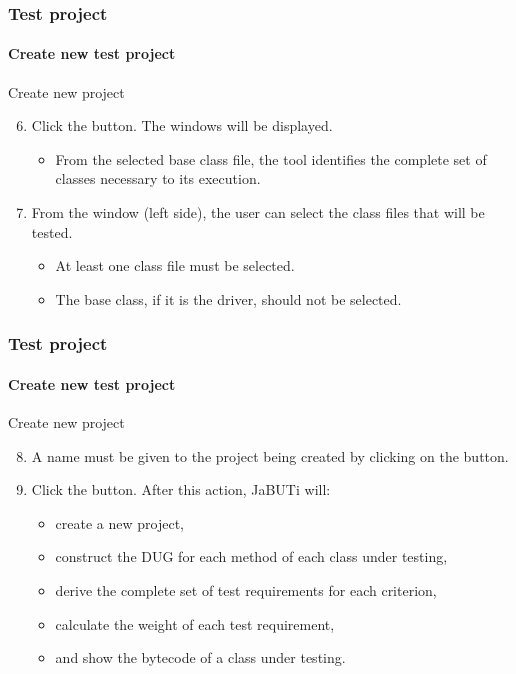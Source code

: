 \begin{frame}
\frametitle{Test project}
\framesubtitle{Create new test project}
\label{procedure:create-test-project}
\label{concept:set-of-application-classes}
\label{concept:classes-to-be-ignored}
\label{concept:classes-to-be-tested}

\begin{block:procedure}{Create new project}
\begin{enumerate}
	\setcounter{enumi}{5}
	\item<1-> Click the  button. The 
	windows will be displayed.
	\begin{itemize}
		\item From the selected base class file, the tool identifies the
		complete set of classes necessary to its execution.
	\end{itemize}

	\item<2-> From the  window (left side), the user
	can 	select the class files that will be tested.
	\begin{itemize}
		\item At least one class file must be selected.

		\item The base class, if it is the driver, should not be selected.
	\end{itemize}
\end{enumerate}
\end{block:procedure}
\end{frame}


\begin{frame}
\frametitle{Test project}
\framesubtitle{Create new test project}
\label{procedure:create-test-project}

\begin{block:procedure}{Create new project}
\begin{enumerate}
	\setcounter{enumi}{7}
	\item<1-> A name must be given to the project being created by clicking on the
	 button.

	\item<2-> Click the  button. After this action, JaBUTi will:
	\begin{itemize}
		\item create a new project,

		\item construct the DUG for each method of each class under
		testing,

		\item derive the complete set of test requirements for each
		criterion,

		\item calculate the weight of each test requirement,

		\item and show the bytecode of a class under testing.
	\end{itemize}
\end{enumerate}
\end{block:procedure}

\end{frame}



